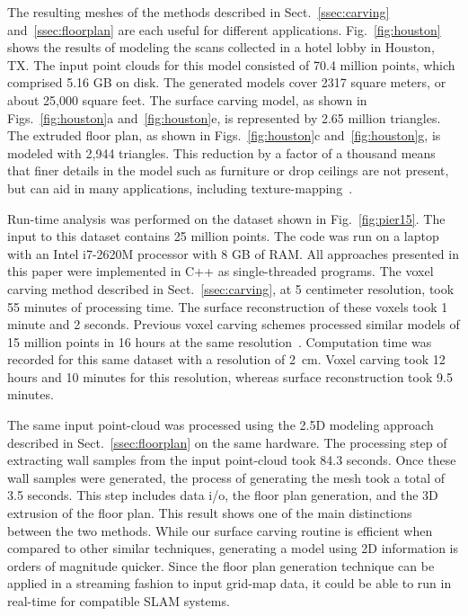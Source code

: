\documentclass[journal]{IEEEtran}
\begin{document}
The resulting meshes of the methods described in Sect.~\ref{ssec:carving} and~\ref{ssec:floorplan} are each useful for different applications.  Fig.~\ref{fig:houston} shows the results of modeling the scans collected in a hotel lobby in Houston, TX.  The input point clouds for this model consisted of 70.4 million points, which comprised 5.16 GB on disk.  The generated models cover 2317 square meters, or about 25,000 square feet.  The surface carving model, as shown in Figs.~\ref{fig:houston}a and~\ref{fig:houston}e, is represented by 2.65 million triangles.  The extruded floor plan, as shown in Figs.~\ref{fig:houston}c and~\ref{fig:houston}g, is modeled with 2,944 triangles.  This reduction by a factor of a thousand means that finer details in the model such as furniture or drop ceilings are not present, but can aid in many applications, including texture-mapping~\cite{Cheng14}.

Run-time analysis was performed on the dataset shown in Fig.~\ref{fig:pier15}.  The input to this dataset contains 25 million points.  The code was run on a laptop with an Intel i7-2620M processor with 8 GB of RAM.  All approaches presented in this paper were implemented in C++ as single-threaded programs.  The voxel carving method described in Sect.~\ref{ssec:carving}, at 5 centimeter resolution, took 55 minutes of processing time.  The surface reconstruction of these voxels took 1 minute and 2 seconds.  Previous voxel carving schemes processed similar models of 15 million points in 16 hours at the same resolution~\cite{Carving}.  Computation time was recorded for this same dataset with a resolution of 2~cm.  Voxel carving took 12 hours and 10 minutes for this resolution, whereas surface reconstruction took 9.5 minutes.

The same input point-cloud was processed using the 2.5D modeling approach described in Sect.~\ref{ssec:floorplan} on the same hardware.  The processing step of extracting wall samples from the input point-cloud took 84.3 seconds.  Once these wall samples were generated, the process of generating the mesh took a total of 3.5 seconds.  This step includes data i/o, the floor plan generation, and the 3D extrusion of the floor plan.  This result shows one of the main distinctions between the two methods.  While our surface carving routine is efficient when compared to other similar techniques, generating a model using 2D information is orders of magnitude quicker.  Since the floor plan generation technique can be applied in a streaming fashion to input grid-map data, it could be able to run in real-time for compatible SLAM systems.
\end{document}
